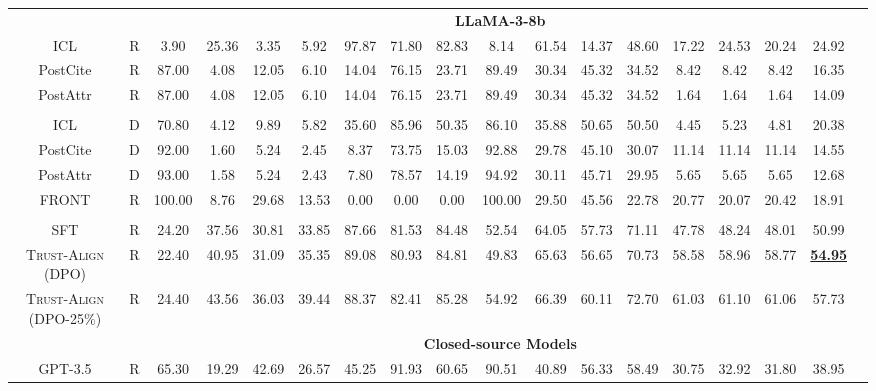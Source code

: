 \documentclass{article} %
\newcommand{\method}[0]{\textsc{Trust-Align}}
\begin{document}
\begin{table}[htb!]
{\begin{tabular}{ccc*{15}c}
& & \multicolumn{15}{c}{\cellcolor[gray]{0.9}\textbf{LLaMA-3-8b}} \\
ICL & R & 3.90 & 25.36 & 3.35 & 5.92 & 97.87 & 71.80 & 82.83 & 8.14 & 61.54 & 14.37 & 48.60 & 17.22 & 24.53 & 20.24 & 24.92 \\
PostCite & R & 87.00 & 4.08 & 12.05 & 6.10 & 14.04 & 76.15 & 23.71 & 89.49 & 30.34 & 45.32 & 34.52 & 8.42 & 8.42 & 8.42 & 16.35 \\
PostAttr & R & 87.00 & 4.08 & 12.05 & 6.10 & 14.04 & 76.15 & 23.71 & 89.49 & 30.34 & 45.32 & 34.52 & 1.64 & 1.64 & 1.64 & 14.09 \\\\
ICL & D & 70.80 & 4.12 & 9.89 & 5.82 & 35.60 & 85.96 & 50.35 & 86.10 & 35.88 & 50.65 & 50.50 & 4.45 & 5.23 & 4.81 & 20.38 \\
PostCite & D & 92.00 & 1.60 & 5.24 & 2.45 & 8.37 & 73.75 & 15.03 & 92.88 & 29.78 & 45.10 & 30.07 & 11.14 & 11.14 & 11.14 & 14.55 \\
PostAttr & D & 93.00 & 1.58 & 5.24 & 2.43 & 7.80 & 78.57 & 14.19 & 94.92 & 30.11 & 45.71 & 29.95 & 5.65 & 5.65 & 5.65 & 12.68 \\
FRONT & R & 100.00 & 8.76 & 29.68 & 13.53 & 0.00 & 0.00 & 0.00 & 100.00 & 29.50 & 45.56 & 22.78 & 20.77 & 20.07 & 20.42 & 18.91 \\\\

SFT & R & 24.20 & 37.56 & 30.81 & 33.85 & 87.66 & 81.53 & 84.48 & 52.54 & 64.05 & 57.73 & 71.11 & 47.78 & 48.24 & 48.01 & 50.99 \\

\method{} (DPO) & R & 22.40 & 40.95 & 31.09 & 35.35 & 89.08 & 80.93 & 84.81 & 49.83 & 65.63 & 56.65 & 70.73 & 58.58 & 58.96 & 58.77 & \underline{\bf 54.95} \\
\method{} (DPO-25\%) & R & 24.40 & 43.56 & 36.03 & 39.44 & 88.37 & 82.41 & 85.28 & 54.92 & 66.39 & 60.11 & 72.70 & 61.03 & 61.10 & 61.06 & 57.73 \\


& & \multicolumn{15}{c}{\cellcolor[gray]{0.9}\textbf{Closed-source Models}} \\
GPT-3.5 & R & 65.30 & 19.29 & 42.69 & 26.57 & 45.25 & 91.93 & 60.65 & 90.51 & 40.89 & 56.33 & 58.49 & 30.75 & 32.92 & 31.80 & 38.95 \\


\end{tabular}}
\end{table}
\end{document}
